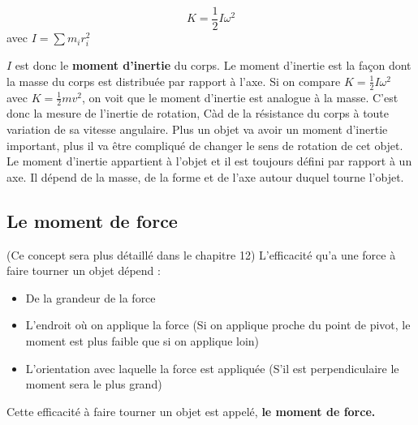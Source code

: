 \documentclass{article}
\begin{document}
\noindent
\[K = \frac{1}{2}I\omega^2\]
avec $I = \sum m_ir_i^2$
\newline

$I$ est donc le \textbf{moment d'inertie} du corps. Le moment d'inertie est la façon dont la masse du corps est distribuée par rapport à l'axe. Si on compare $K = \frac{1}{2}I\omega^2$ avec $K = \frac{1}{2}mv^2$, on voit que le moment d'inertie est analogue à la masse. C'est donc la mesure de l'inertie de rotation, Càd de la résistance du corps à toute variation de sa vitesse angulaire.
\newline
Plus un objet va avoir un moment d'inertie important, plus il va être compliqué de changer le sens de rotation de cet objet.
\newline
Le moment d'inertie appartient à l'objet et il est toujours défini par rapport à un axe. Il dépend de la masse, de la forme et de l'axe autour duquel tourne l'objet.


\subsection{Le moment de force}
(Ce concept sera plus détaillé dans le chapitre 12)
\newline
L'efficacité qu'a une force à faire tourner un objet dépend :
\begin{itemize}
    \item De la grandeur de la force
    \item L'endroit où on applique la force (Si on applique proche du point de pivot, le moment est plus faible que si on applique loin)
    \item L'orientation avec laquelle la force est appliquée (S'il est perpendiculaire le moment sera le plus grand)
\end{itemize}
Cette efficacité à faire tourner un objet est appelé, \textbf{le moment de force.}
\newline
\end{document}
